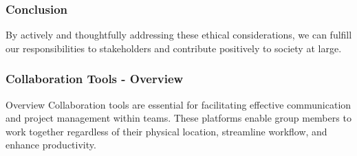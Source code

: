 \documentclass[aspectratio=169]{beamer}
\begin{document}
\begin{frame}[fragile]
    \frametitle{Conclusion}
    By actively and thoughtfully addressing these ethical considerations, we can fulfill our responsibilities to stakeholders and contribute positively to society at large.
\end{frame}

\begin{frame}[fragile]
    \frametitle{Collaboration Tools - Overview}
    \begin{block}{Overview}
        Collaboration tools are essential for facilitating effective communication and project management within teams. 
        These platforms enable group members to work together regardless of their physical location, streamline workflow, and enhance productivity.
    \end{block}
\end{frame}
\end{document}
